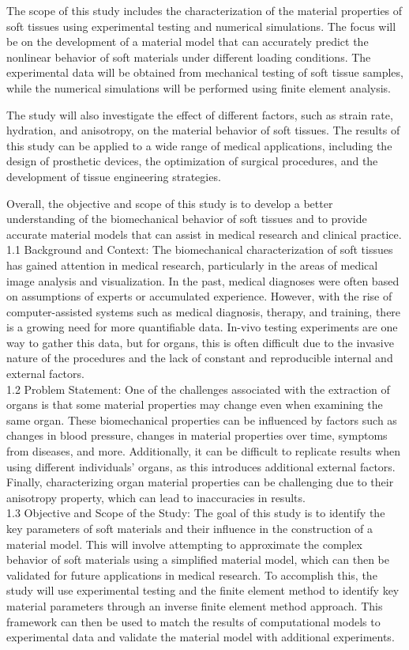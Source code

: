 The scope of this study includes the characterization of the material properties of soft tissues using experimental testing and numerical simulations. The focus will be on the development of a material model that can accurately predict the nonlinear behavior of soft materials under different loading conditions. The experimental data will be obtained from mechanical testing of soft tissue samples, while the numerical simulations will be performed using finite element analysis.

The study will also investigate the effect of different factors, such as strain rate, hydration, and anisotropy, on the material behavior of soft tissues. The results of this study can be applied to a wide range of medical applications, including the design of prosthetic devices, the optimization of surgical procedures, and the development of tissue engineering strategies.

Overall, the objective and scope of this study is to develop a better understanding of the biomechanical behavior of soft tissues and to provide accurate material models that can assist in medical research and clinical practice.\\
1.1 Background and Context:
The biomechanical characterization of soft tissues has gained attention in medical research, particularly in the areas of medical image analysis and visualization. In the past, medical diagnoses were often based on assumptions of experts or accumulated experience. However, with the rise of computer-assisted systems such as medical diagnosis, therapy, and training, there is a growing need for more quantifiable data. In-vivo testing experiments are one way to gather this data, but for organs, this is often difficult due to the invasive nature of the procedures and the lack of constant and reproducible internal and external factors.\\
1.2 Problem Statement:
One of the challenges associated with the extraction of organs is that some material properties may change even when examining the same organ. These biomechanical properties can be influenced by factors such as changes in blood pressure, changes in material properties over time, symptoms from diseases, and more. Additionally, it can be difficult to replicate results when using different individuals' organs, as this introduces additional external factors. Finally, characterizing organ material properties can be challenging due to their anisotropy property, which can lead to inaccuracies in results.\\
1.3 Objective and Scope of the Study:
The goal of this study is to identify the key parameters of soft materials and their influence in the construction of a material model. This will involve attempting to approximate the complex behavior of soft materials using a simplified material model, which can then be validated for future applications in medical research. To accomplish this, the study will use experimental testing and the finite element method to identify key material parameters through an inverse finite element method approach. This framework can then be used to match the results of computational models to experimental data and validate the material model with additional experiments.
